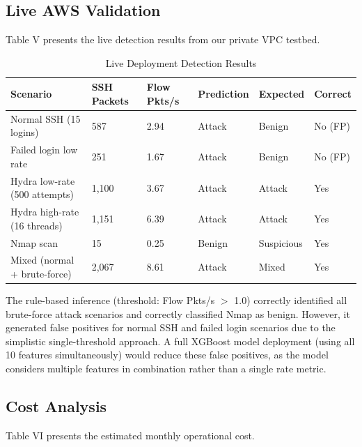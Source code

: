 \documentclass[conference]{IEEEtran}
\begin{document}
\subsection{Live AWS Validation}

Table V presents the live detection results from our private VPC testbed.

\begin{table}[!ht]
\centering
\caption{Live Deployment Detection Results}
\footnotesize
\setlength{\tabcolsep}{3pt}
\begin{tabulary}{\textwidth}{|l|L|L|L|L|L|}
\hline
\textbf{Scenario} & \textbf{SSH Packets} & \textbf{Flow Pkts/s} & \textbf{Prediction} & \textbf{Expected} & \textbf{Correct} \\
\hline
Normal SSH (15 logins) & 587 & 2.94 & Attack & Benign & No (FP) \\
Failed login low rate & 251 & 1.67 & Attack & Benign & No (FP) \\
Hydra low-rate (500 attempts) & 1,100 & 3.67 & Attack & Attack & Yes \\
Hydra high-rate (16 threads) & 1,151 & 6.39 & Attack & Attack & Yes \\
Nmap scan & 15 & 0.25 & Benign & Suspicious & Yes \\
Mixed (normal + brute-force) & 2,067 & 8.61 & Attack & Mixed & Yes \\
\hline
\end{tabulary}
\end{table}

The rule-based inference (threshold: Flow Pkts/s $>$ 1.0) correctly identified all brute-force attack scenarios and correctly classified Nmap as benign. However, it generated false positives for normal SSH and failed login scenarios due to the simplistic single-threshold approach. A full XGBoost model deployment (using all 10 features simultaneously) would reduce these false positives, as the model considers multiple features in combination rather than a single rate metric.

\subsection{Cost Analysis}

Table VI presents the estimated monthly operational cost.
\end{document}
